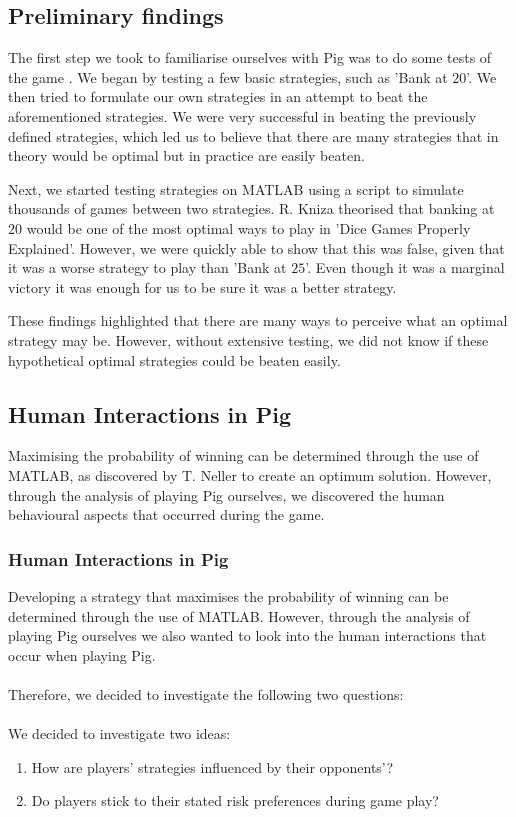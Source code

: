 \documentclass[a4paper,titlepage]{article}
\begin{document}
\subsection{Preliminary findings}
The first step we took to familiarise ourselves with Pig was to do some tests of the game . We began by testing a few basic strategies, such as 'Bank at $20$'. We then tried to formulate our own strategies in an attempt to beat the aforementioned strategies. We were very successful in beating the previously defined strategies, which led us to believe that there are many strategies that in theory would be optimal but in practice are easily beaten.

Next, we started testing strategies on MATLAB using a script to simulate thousands of games between two strategies. R. Kniza theorised that banking at $20$ would be one of the most optimal ways to play in 'Dice Games Properly Explained'. However, we were quickly able to show that this was false, given that it was a worse strategy to play than 'Bank at $25$'. Even though it was a marginal victory it was enough for us to be sure it was a better strategy.

These findings highlighted that there are many ways to perceive what an optimal strategy may be. However, without extensive testing, we did not know if these hypothetical optimal strategies could be beaten easily.

\subsection{Human Interactions in Pig}
Maximising the probability of winning can be determined through the use of MATLAB, as discovered by T. Neller\cite{neller2004optimal} to create an optimum solution. However, through the analysis of playing Pig ourselves, we discovered the human behavioural aspects that occurred during the game.


\subsubsection{Human Interactions in Pig}
Developing a strategy that maximises the probability of winning can be determined through the use of MATLAB. However, through the analysis of playing Pig ourselves we also wanted to look into the human interactions that occur when playing Pig.
\\
\\
Therefore, we decided to investigate the following two questions:
\\
\\
We decided to investigate two ideas:
\begin{enumerate}
\item How are players' strategies influenced by their opponents'?
\item Do players stick to their stated risk preferences during game play?
\end{enumerate}
\end{document}
